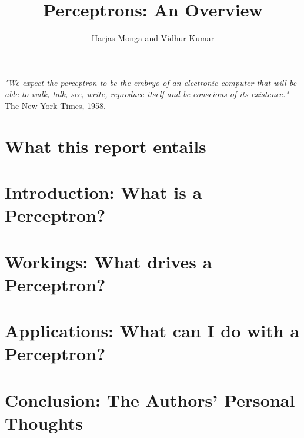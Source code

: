 \documentclass[12pt, titlepage, a4paper]{article}
\title{Perceptrons: An Overview}
\author{Harjas Monga and Vidhur Kumar}
\begin{document}
	\maketitle
	
	\tableofcontents
	
	\newpage

	\textit{"We expect the perceptron to be the embryo of an electronic computer that will be able to walk, talk, see, write, reproduce itself and be conscious of its existence."} - The New York Times, 1958.	
	
	\section{What this report entails}
			
	
	\section{Introduction: What is a Perceptron?}
		
	
	\section{Workings: What drives a Perceptron?}
		
	\section{Applications: What can I do with a Perceptron?}
		
	\section{Conclusion: The Authors' Personal Thoughts}
		
\end{document}
